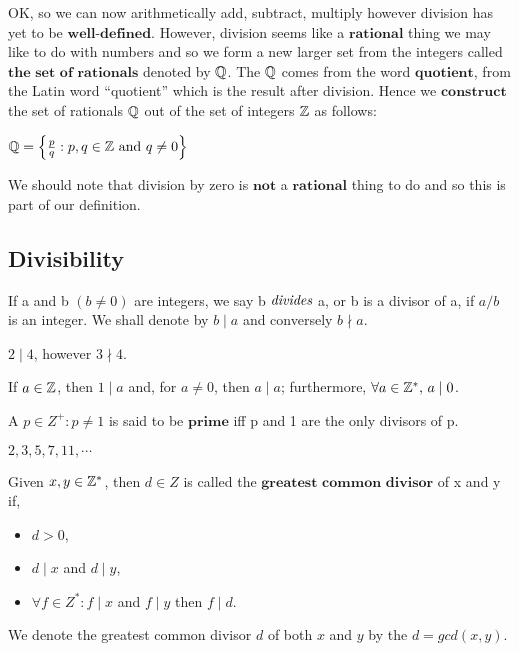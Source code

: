 OK, so we can now arithmetically add, subtract, multiply however division has yet to be $\textbf{well-defined}$. However, division
seems like a $\textbf{rational}$ thing we may like to do with numbers and so we form a new larger set from the integers called
$\textbf{the set of rationals}$ denoted by $\mathbb{Q}$. The $\mathbb{Q}$ comes from the word $\textbf{quotient}$, from the Latin word ``quotient''
which is the result after division. Hence we $\textbf{construct}$ the set of rationals $\mathbb{Q}$ out of the set of integers $\mathbb{Z}$ as follows:
\begin{defn}
 $\mathbb{Q} = \left\{ \frac{p}{q} : p,q \in \mathbb{Z} \text{ and } q \neq 0 \right\} $
\end{defn}
We should note that division by zero is $\textbf{not}$ a $\textbf{rational}$ thing to do and so this is part of our definition.

\subsection{Divisibility} %
\label{subsec:divisibility}
If a and b $(b \neq 0)$ are integers, we say b $\emph{divides}$ a, or b is a divisor of a,
if $a/b$ is an integer. We shall denote by $b \mid a$ and conversely $b \nmid a$.

\begin{exmp}
 $2 \mid 4$, however $3 \nmid 4$.
\end{exmp}

\begin{exmp}
 If $a \in \mathbb{Z}$, then $1 \mid a$ and, for $a \neq 0$, then $a \mid a$; furthermore, $\forall a \in \mathbb{Z}^*, \, a \mid 0$.
\end{exmp}

\begin{defn}
 A $p \in Z^+ : p \neq 1$ is said to be $\textbf{prime}$ iff
 p and 1 are the only divisors of p.
\end{defn}

\begin{exmp}
 $2, 3, 5, 7, 11, \cdots$
\end{exmp}

\begin{defn}
 Given $x, y \in \mathbb{Z}^*$, then $d \in Z$ is called the $\textbf{greatest common divisor}$ of x and y if,
 \begin{itemize}
  \item $d > 0$,
  \item $d \mid x$ and $d \mid y$,
  \item $\forall f \in Z^* : f \mid x$ and $f \mid y$ then $f \mid d$.
 \end{itemize}
\end{defn}
We denote the greatest common divisor $d$ of both $x$ and $y$ by the $d = gcd(x,y)$.

